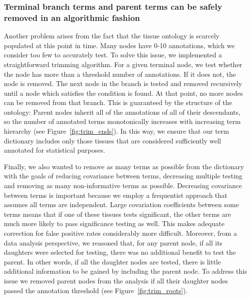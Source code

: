 \documentclass[linenumbers, doublespacing]{bmcart}
\begin{document}
\subsubsection*{Terminal branch terms and parent terms can be safely removed in an algorithmic fashion }
Another problem arises from the fact that the tissue ontology is scarcely populated at this point in time. Many nodes have 0-10 annotations, which we consider too few to accurately test. To solve this issue, we implemented a straightforward trimming algorithm. For a given terminal node, we test whether the node has more than a threshold number of annotations. If it does not, the node is removed. The next node in the branch is tested and removed recursively until a node which satisfies the condition is found. At that point, no more nodes can be removed from that branch. This is guaranteed by the structure of the ontology: Parent nodes inherit all of the annotations of all of their descendants, so the number of annotated terms monotonically increases with increasing term hierarchy (see Figure~\ref{fig:trim_ends}). In this way, we ensure that our term dictionary includes only those tissues that are considered sufficiently well annotated for statistical purposes.

	Finally, we also wanted to remove as many terms as possible from the dictionary with the goals of reducing covariance between terms, decreasing multiple testing and removing as many non-informative terms as possible. Decreasing covariance between terms is important because we employ a frequentist approach that assumes all terms are independent. Large covariation coefficients between some terms means that if one of these tissues tests significant, the other terms are much more likely to pass significance testing as well. This makes adequate correction for false positive rates considerably more difficult. Moreover, from a data analysis perspective, we reasoned that, for any parent node, if all its daughters were selected for testing, there was no additional benefit to test the parent. In other words, if all the daughter nodes are tested, there is little additional information to be gained by including the parent node.  To address this issue we removed parent nodes from the analysis if all their daughter nodes passed the annotation threshold (see Figure~\ref{fig:trim_roots}).
\end{document}
